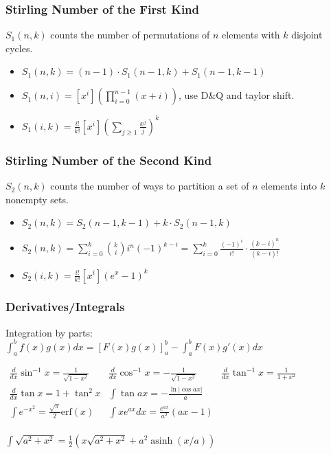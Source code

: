\subsubsection{Stirling Number of the First Kind}
$S_1(n, k)$ counts the number of permutations of $n$ elements with $k$ disjoint cycles.
\begin{itemize}
  \item
    $S_1(n, k) = (n - 1) \cdot S_1(n - 1, k) + S_1(n - 1, k - 1)$
  \item
    $S_1(n, i) = [x^i] \left(\prod _ {i=0} ^ {n-1} (x + i)\right)$,
    use D\&Q and taylor shift.
  \item
    \(
    S_1(i, k) = \frac{i!}{k!} \left[x^i\right] 
    \left(\sum _ {j \ge 1} \frac{x^j}{j}\right)^k
    \)
\end{itemize}

\subsubsection{Stirling Number of the Second Kind}
$S_2(n, k)$ counts the number of ways to partition a set of $n$ elements into $k$ nonempty sets.
\begin{itemize}
  \item $S_2(n, k) = S_2(n - 1, k - 1) + k \cdot S_2(n - 1, k)$
  \item
    \(
    S_2(n, k) = \sum_{i = 0}^k \binom{k}{i}i^n (-1)^{k - i} = \sum_{i = 0}^k \frac{(-1)^i}{i!} \cdot \frac{(k - i)^n}{(k - i)!}
    \)
  \item
    \(
    S_2(i, k) = \frac{i!}{k!} [x^i] \left(e^x - 1\right)^k
    \)
\end{itemize}

\subsubsection{Derivatives/Integrals}
Integration by parts:
\(\int_a^bf(x)g(x)dx = [F(x)g(x)]_a^b-\int_a^bF(x)g'(x)dx\)
{

  \noindent
  \(
  \begin{aligned}
    \frac{d}{dx}\sin^{-1} x = \frac{1}{\sqrt{1-x^2}}
    &
    \frac{d}{dx}\cos^{-1} x = -\frac{1}{\sqrt{1-x^2}}
    &
    \frac{d}{dx}\tan^{-1} x = \frac{1}{1+x^2}
    \\
    \frac{d}{dx}\tan x = 1+\tan^2 x
    &
    \int\tan ax = -\frac{\ln|\cos ax|}{a}
    &
    \\
    \int e^{-x^2} = \frac{\sqrt \pi}{2} \text{erf}(x)
    &
    \int xe^{ax}dx = \frac{e^{ax}}{a^2}(ax-1)
    \\
  \end{aligned}
  \)
  
  \(
    \int \sqrt{a^2 + x^2} = \frac{1}{2} \left(x\sqrt{a^2+x^2} + a^2 \operatorname{asinh}(x/a) \right)
  \)
}

